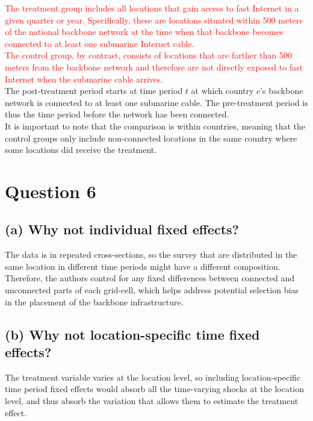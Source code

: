 \documentclass{scrartcl}
\newcommand{\marco}[1]{\textcolor{red}{#1}}
\begin{document}

\marco{The treatment group includes all locations that gain access to fast Internet in a given quarter or year. Specifically, these are locations situated within 500 meters of the national backbone network at the time when that backbone becomes connected to at least one submarine Internet cable. \\
The control group, by contrast, consists of locations that are farther than 500 meters from the backbone network and therefore are not directly exposed to fast Internet when the submarine cable arrives.} \\

The post-treatment period starts at time period $t$ at which country $c$'s backbone network is connected to at least one submarine cable. The pre-treatment period is thus the time period before the network has been connected. \\

It is important to note that the comparison is within countries, meaning that the control groups only include non-connected locations in the same country where some locations did receive the treatment.   

\section*{Question 6}

\subsection*{(a) Why not individual fixed effects?}



The data is in repeated cross-sections, so the survey that are distributed in the same location in different time periods might have a different composition. Therefore, the authors control for any fixed differences between connected and unconnected parts of each grid-cell, which helps address potential selection bias in the placement of the backbone infrastructure. 


\subsection*{(b) Why not location-specific time fixed effects?}

The treatment variable varies at the location level, so including location-specific time period fixed effects would absorb all the time-varying shocks at the location level, and thus absorb the variation that allows them to estimate the treatment effect.
\end{document}
